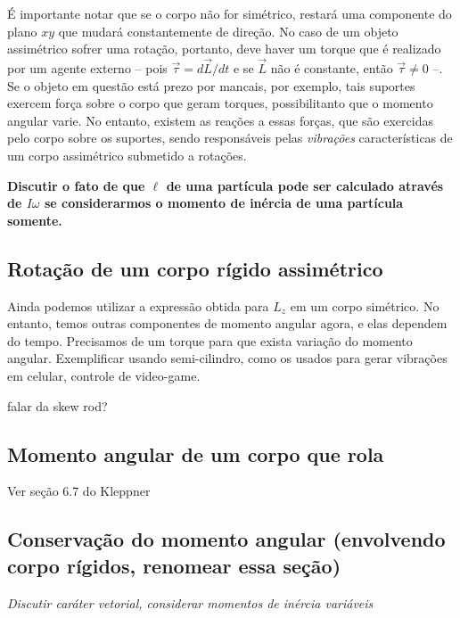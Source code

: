É importante notar que se o corpo não for simétrico, restará uma componente do plano $xy$ que mudará constantemente de direção. No caso de um objeto assimétrico sofrer uma rotação, portanto, deve haver um torque que é realizado por um agente externo -- pois $\vec{\tau} = d\vec{L} / dt$ e se $\vec{L}$ não é constante, então $\vec{\tau} \neq 0$ --. Se o objeto em questão está prezo por mancais, por exemplo, tais suportes exercem força sobre o corpo que geram torques, possibilitanto que o momento angular varie. No entanto, existem as reações a essas forças, que são exercidas pelo corpo sobre os suportes, sendo responsáveis pelas \emph{vibrações} características de um corpo assimétrico submetido a rotações.

\textbf{Discutir o fato de que $\ell$ de uma partícula pode ser calculado através de $I\omega$ se considerarmos o momento de inércia de uma partícula somente.}

\subsection{Rotação de um corpo rígido assimétrico}

Ainda podemos utilizar a expressão obtida para $L_z$ em um corpo simétrico. No entanto, temos outras componentes de momento angular agora, e elas dependem do tempo. Precisamos de um torque para que exista variação do momento angular. Exemplificar usando semi-cilindro, como os usados para gerar vibrações em celular, controle de video-game.

falar da skew rod?

\subsection{Momento angular de um corpo que rola}

Ver seção 6.7 do Kleppner

\subsection{Conservação do momento angular (envolvendo corpo rígidos, renomear essa seção)}

\emph{Discutir caráter vetorial, considerar momentos de inércia variáveis}

